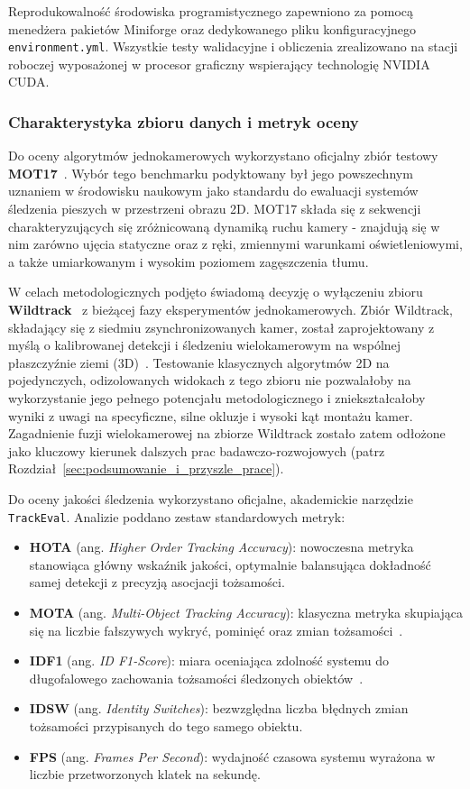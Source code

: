Reprodukowalność środowiska programistycznego zapewniono za pomocą menedżera pakietów Miniforge
oraz dedykowanego pliku konfiguracyjnego \texttt{environment.yml}. Wszystkie testy walidacyjne i
obliczenia zrealizowano na stacji roboczej wyposażonej w procesor graficzny wspierający technologię
NVIDIA CUDA.

\subsubsection{Charakterystyka zbioru danych i metryk oceny}
Do oceny algorytmów jednokamerowych wykorzystano oficjalny zbiór testowy
\textbf{MOT17}~\cite{milan2016}. Wybór tego benchmarku podyktowany był jego powszechnym uznaniem w
środowisku naukowym jako standardu do ewaluacji systemów śledzenia pieszych w przestrzeni obrazu
2D. MOT17 składa się z sekwencji charakteryzujących się zróżnicowaną dynamiką ruchu kamery -
znajdują się w nim zarówno ujęcia statyczne oraz z ręki, zmiennymi warunkami oświetleniowymi, a
także umiarkowanym i wysokim poziomem zagęszczenia tłumu.

W celach metodologicznych podjęto świadomą decyzję o wyłączeniu zbioru
\textbf{Wildtrack}~\cite{zheng2017wild} z bieżącej fazy eksperymentów jednokamerowych. Zbiór
Wildtrack, składający się z siedmiu zsynchronizowanych kamer, został zaprojektowany z myślą o
kalibrowanej detekcji i śledzeniu wielokamerowym na wspólnej płaszczyźnie ziemi
(3D)~\cite{zheng2017wild}. Testowanie klasycznych algorytmów 2D na pojedynczych, odizolowanych
widokach z tego zbioru nie pozwalałoby na wykorzystanie jego pełnego potencjału metodologicznego i
zniekształcałoby wyniki z uwagi na specyficzne, silne okluzje i wysoki kąt montażu kamer.
Zagadnienie fuzji wielokamerowej na zbiorze Wildtrack zostało zatem odłożone jako kluczowy kierunek
dalszych prac badawczo-rozwojowych (patrz Rozdział~\ref{sec:podsumowanie_i_przyszle_prace}).

Do oceny jakości śledzenia wykorzystano oficjalne, akademickie narzędzie \texttt{TrackEval}.
Analizie poddano zestaw standardowych metryk:
\begin{itemize}
  \item \textbf{HOTA} (ang. \textit{Higher Order Tracking Accuracy}): nowoczesna metryka stanowiąca główny wskaźnik jakości, optymalnie balansująca dokładność samej detekcji z precyzją asocjacji tożsamości.
  \item \textbf{MOTA} (ang. \textit{Multi-Object Tracking Accuracy}): klasyczna metryka skupiająca się na liczbie fałszywych wykryć, pominięć oraz zmian tożsamości~\cite{bernardin2008}.
  \item \textbf{IDF1} (ang. \textit{ID F1-Score}): miara oceniająca zdolność systemu do długofalowego zachowania tożsamości śledzonych obiektów~\cite{ristani}.
  \item \textbf{IDSW} (ang. \textit{Identity Switches}): bezwzględna liczba błędnych zmian tożsamości przypisanych do tego samego obiektu.
  \item \textbf{FPS} (ang. \textit{Frames Per Second}): wydajność czasowa systemu wyrażona w liczbie przetworzonych klatek na sekundę.
\end{itemize}

